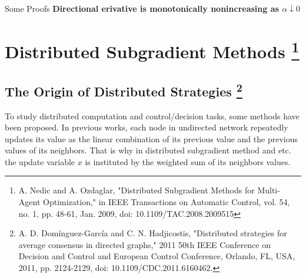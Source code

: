 	\begin{Notes}{Some Proofs}{} \label{subgradientProofs}
		\textbf{Directional erivative is monotonically nonincreasing as $\alpha\downarrow 0$}
			
	\end{Notes}
		

\section{Distributed Subgradient Methods \protect \footnote{A. Nedic and A. Ozdaglar, "Distributed Subgradient Methods for Multi-Agent Optimization," in IEEE Transactions on Automatic Control, vol. 54, no. 1, pp. 48-61, Jan. 2009, doi: 10.1109/TAC.2008.2009515}}
	\subsection{The Origin of Distributed Strategies \protect \footnote{A. D. Domínguez-García and C. N. Hadjicostis, "Distributed strategies for average consensus in directed graphs," 2011 50th IEEE Conference on Decision and Control and European Control Conference, Orlando, FL, USA, 2011, pp. 2124-2129, doi: 10.1109/CDC.2011.6160462.}}
	To study distributed computation and control/decision tasks, some methods have been proposed. In previous works, each node in undirected network repeatedly updates its value as the linear combination of its previous value and the previous values of its neighbors. That is why in distributed subgradient method and etc. the update variable $x$ is instituted by the weighted sum of its neighbors values.
	
